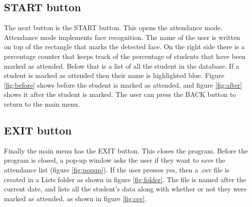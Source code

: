\documentclass[12pt, a4paper]{article}
\begin{document}
\subsection{START button}
The next button is the START button. This opens the attendance mode. Attendance mode implements face recognition. The name of the user is written on top of the rectangle that marks the detected face. On the right side there is a percentage counter that keeps track of the percentage of students that have been marked as attended. Below that is a list of all the student in the database. If a student is marked as attended then their name is highlighted blue. Figure \ref{fig:before} shows before the student is marked as attended, and figure \ref{fig:after} shows it after the student is marked. The user can press the BACK button to return to the main menu.  

\subsection{EXIT button}
Finally the main menu has the EXIT button. This closes the program. Before the program is closed, a pop-up window asks the user if they want to save the attendance list (figure \ref{fig:popup}). If the user presses yes, then a .csv file is created in a Lists folder as shown in figure \ref{fig:folder}. The file is named after the current date, and lists all the student’s data along with whether or not they were marked as attended, as shown in figure \ref{fig:csv}.
\end{document}
